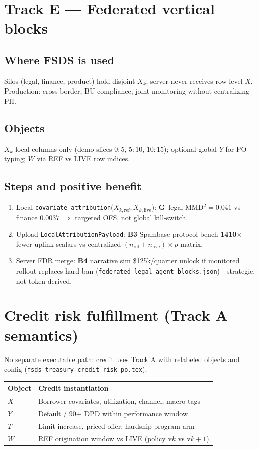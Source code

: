 \documentclass[11pt]{article}
\newcommand{\indirect}{\textbf{\small G}}
\begin{document}
\section{Track E --- Federated vertical blocks}

\subsection{Where FSDS is used}
Silos (legal, finance, product) hold disjoint $X_k$; server never receives row-level $X$.
Production: cross-border, BU compliance, joint monitoring without centralizing PII.

\subsection{Objects}
$X_k$ local columns only (demo slices $0{:}5$, $5{:}10$, $10{:}15$); optional global $Y$ for PO typing; $W$ via REF vs LIVE row indices.

\subsection{Steps and positive benefit}
\begin{enumerate}[nosep]
  \item Local \texttt{covariate\_attribution}($X_{k,\mathrm{ref}},X_{k,\mathrm{live}}$): \indirect\ legal MMD$^2=0.041$ vs finance $0.0037$ $\Rightarrow$ targeted OFS, not global kill-switch.
  \item Upload \texttt{LocalAttributionPayload}: \textbf{B3} Spambase protocol bench \textbf{1410$\times$} fewer uplink scalars vs centralized $(n_{\mathrm{ref}}+n_{\mathrm{live}})\times p$ matrix.
  \item Server FDR merge: \textbf{B4} narrative sim \$125k/quarter unlock if monitored rollout replaces hard ban (\texttt{federated\_legal\_agent\_blocks.json})---strategic, not token-derived.
\end{enumerate}

\section{Credit risk fulfillment (Track A semantics)}
\label{sec:credit}
No separate executable path: credit uses Track A with relabeled objects and config (\texttt{fsds\_treasury\_credit\_risk\_po.tex}).
\begin{center}
\begin{tabular}{@{}ll@{}}
\toprule
Object & Credit instantiation \\
\midrule
$X$ & Borrower covariates, utilization, channel, macro tags \\
$Y$ & Default / 90+ DPD within performance window \\
$T$ & Limit increase, priced offer, hardship program arm \\
$W$ & REF origination window vs LIVE (policy v$k$ vs v$k{+}1$) \\
\bottomrule
\end{tabular}
\end{center}
\end{document}
